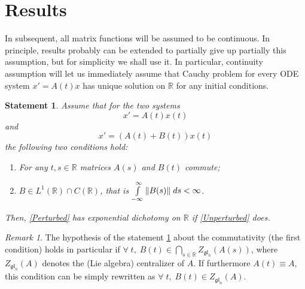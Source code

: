 \documentclass[12pt]{article} %
\let\oldforall\forall
\renewcommand{\forall}{\oldforall\;}
\newtheorem{proposition}{Statement}
\theoremstyle{remark}
\newtheorem{remark}{Remark}
\begin{document}
\section{Results}
In subsequent, all matrix functions will be assumed to be continuous. In principle, results probably can be extended to partially
give up partially this assumption, but for simplicity we shall use it. In particular, continuity assumption will let us immediately assume
that Cauchy problem for every ODE system $x'=A(t)x$ has unique solution on $\mathbb{R}$ for any initial conditions.
\begin{proposition}
	\label{strong}
	Assume that for the two systems 
	\begin{equation}\label{Unperturbed}
	x'=A(t)x(t)
	\end{equation}
	and
	\begin{equation}\label{Perturbed}
	x'=(A(t)+B(t))x(t)
	\end{equation}
	the following two conditions hold:
	\begin{enumerate}[(1)]
	\item For any $t,s\in\mathbb{R}$ matrices $A(s)$ and $B(t)$ commute;
	\item $B\in L^1(\mathbb{R})\cap C(\mathbb{R})$, that is $\int_{-\infty}^{\infty}\mynorm{B(s)}\;ds<\infty$.
	\end{enumerate}
	Then, \eqref{Perturbed} has exponential dichotomy on $\mathbb{R}$ if \eqref{Unperturbed} does.
\end{proposition}
\begin{remark}The hypothesis of the statement \ref{strong} about the commutativity (the first condition) holds in particular if
	$\forall t,\;B(t)\in\bigcap\limits_{s\in\mathbb{R}} Z_{\mathfrak{gl}_n}(A(s))$, where
	$Z_{\mathfrak{gl}_n}(A)$ denotes the (Lie algebra) centralizer of $A$.
	If furthermore $A(t)\equiv A$, this condition can be simply rewritten as $\forall t,\;B(t)\in Z_{\mathfrak{gl}_n}(A)$.\end{remark}
\end{document}
